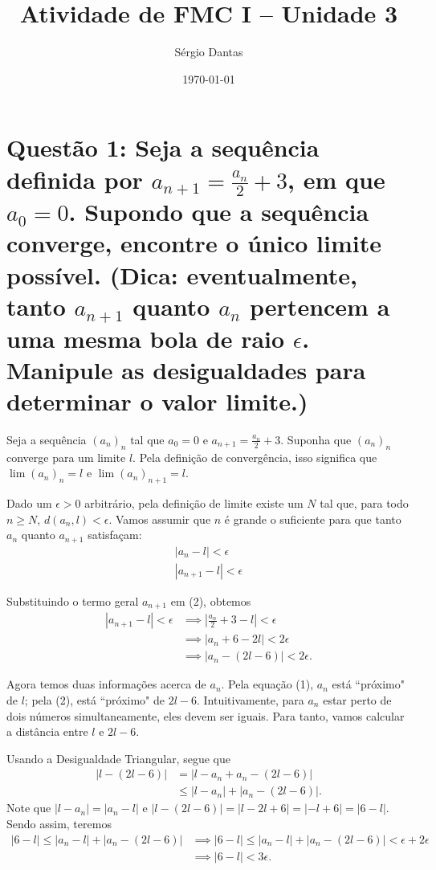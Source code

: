 \documentclass[12pt]{article}
\title{Atividade de FMC I -- Unidade 3}
\author{Sérgio Dantas}
\date{\today}
\begin{document}
	\maketitle
	
	\section*{Questão 1: Seja a sequência definida por $a_{n + 1} = \frac{a_n}{2} + 3$, em que $a_0 = 0$. Supondo que a sequência converge, encontre o único limite possível. (Dica: eventualmente, tanto $a_{n + 1}$ quanto $a_n$ pertencem a uma mesma bola de raio $\epsilon$. Manipule as desigualdades para determinar o valor limite.)}
	
	Seja a sequência $(a_n)_n$ tal que $a_0 = 0$ e $a_{n + 1} = \frac{a_n}{2} + 3$. Suponha que $(a_n)_n$ converge para um limite $l$. Pela definição de convergência, isso significa que $\lim(a_n)_n = l$ e $\lim(a_n)_{n + 1} = l$.
	
	Dado um $\epsilon > 0$ arbitrário, pela definição de limite existe um $N$ tal que, para todo $n \geq N$, $d(a_n, l) < \epsilon$. Vamos assumir que $n$ é grande o suficiente para que tanto $a_n$ quanto $a_{n + 1}$ satisfaçam:
	\begin{gather}
		|a_n - l| < \epsilon \\
		|a_{n + 1} - l| < \epsilon
	\end{gather}
	
	Substituindo o termo geral $a_{n + 1}$ em (2), obtemos
	\begin{align*}
		|a_{n + 1} - l| < \epsilon
		&\implies \left|\frac{a_n}{2} + 3 - l\right| < \epsilon \\
		&\implies |a_n + 6 - 2l| < 2\epsilon \\
		&\implies |a_n - (2l - 6)| < 2\epsilon.
	\end{align*}
	
	Agora temos duas informações acerca de $a_n$. Pela equação (1), $a_n$ está ``próximo" de $l$; pela (2), está ``próximo" de $2l - 6$. Intuitivamente, para $a_n$ estar perto de dois números simultaneamente, eles devem ser iguais. Para tanto, vamos calcular a distância entre $l$ e $2l - 6$.
	
	Usando a Desigualdade Triangular, segue que
	\begin{align*}
		|l - (2l - 6)|
		&= |l - a_n + a_n - (2l - 6)| \\
		&\leq |l - a_n| + |a_n - (2l - 6)|.
	\end{align*}
	Note que $|l - a_n| = |a_n - l|$ e $|l - (2l - 6)| = |l - 2l + 6| = |-l + 6| = |6 - l|$. Sendo assim, teremos
	\begin{align*}
		|6 - l| \leq |a_n - l| + |a_n - (2l - 6)|
		&\implies |6 - l| \leq |a_n - l| + |a_n - (2l - 6)| < \epsilon + 2\epsilon \\
		&\implies |6 - l| < 3\epsilon.
	\end{align*}
	
\end{document}

